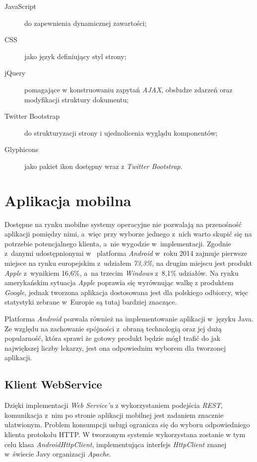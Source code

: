 \documentclass[11pt]{aghdpl}
\begin{document}
\begin{description}
\item[JavaScript] do zapewnienia dynamicznej zawartości;
\item[CSS] jako język definiujący styl strony;
\item[jQuery] pomagające w konstruowaniu zapytań \emph{AJAX}, obsłudze zdarzeń oraz modyfikacji struktury dokumentu;
\item[Twitter Bootstrap] do strukturyzacji strony i ujednolicenia wyglądu komponentów;
\item[Glyphicons] jako pakiet ikon dostępny wraz z \emph{Twitter Bootstrap}.
\end{description}

\section{Aplikacja mobilna}

Dostępne na rynku mobilne systemy operacyjne nie pozwalają na przenośność aplikacji pomiędzy nimi, a~więc przy wyborze jednego z~nich warto skupić się na potrzebie potencjalnego klienta, a~nie wygodzie w~implementacji. Zgodnie z~danymi udostępnionymi w~\cite{AMS} platforma \emph{Android} w~roku 2014 zajmuje pierwsze miejsce na rynku europejskim z~udziałem \emph{73,3\%}, na drugim miejscu jest produkt \emph{Apple} z~wynikiem 16,6\%, a~na trzecim \emph{Windows} z~8,1\% udziałów. Na rynku amerykańskim sytuacja \emph{Apple} poprawia się wyrównując walkę z produktem \emph{Google}, jednak tworzona aplikacja dostosowana jest dla polskiego odbiorcy, więc statystyki zebrane w~Europie są tutaj bardziej znaczące.

Platforma \emph{Android} pozwala również na implementowanie aplikacji w~języku Java. Ze względu na zachowanie spójności z~obraną technologią oraz jej dużą popularność, która sprawi że gotowy produkt będzie mógł trafić do jak największej liczby lekarzy, jest ona odpowiednim wyborem dla tworzonej aplikacji.

\subsection{Klient WebService}

Dzięki implementacji \emph{Web Service'u} z wykorzystaniem podejścia \emph{REST}, komunikacja z~nim po stronie aplikacji mobilnej jest zadaniem znacznie ułatwionym. Problem konsumpcji usługi ogranicza się do wyboru odpowiedniego klienta protokołu HTTP. W tworzonym systemie wykorzystana zostanie w tym celu klasa \emph{AndroidHttpClient}, implementująca interfejs \emph{HttpClient} znanej w~świecie Javy organizacji \emph{Apache}.
\end{document}
